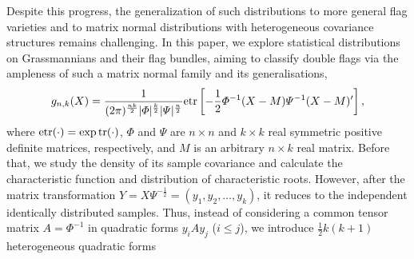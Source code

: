 \documentclass{amsart}
\theoremstyle{definition}
\numberwithin{equation}{section}
\begin{document}
Despite this progress, the generalization of such distributions to more general flag varieties and to matrix normal distributions with heterogeneous covariance structures remains challenging. In this paper, we explore statistical distributions on Grassmannians and their flag bundles, aiming to classify double flags via the ampleness of such a matrix normal family and its generalisations,
\begin{equation}
    \begin{aligned}
        g_{n,k}({X})  = \frac{1}{(2\pi)^{\frac{nk}{2}}| \varPhi|^{\frac{k}{2}}| \varPsi|^{\frac{n}{2}}} {\rm etr}\left[ - \frac{1}{2}\varPhi^{-1}({X} -  M) \varPsi^{-1}({X} -  M)^{\prime}\right],
    \end{aligned}
    \label{eq: dawid matrix normal distribution}
\end{equation}
where ${\rm etr}(\cdot) = \exp {\rm tr}(\cdot)$, $ \varPhi$ and $ \varPsi$ are $n\times n$ and $k \times k$ real symmetric positive definite matrices, respectively, and $ M$ is an arbitrary $n \times k$ real matrix. Before that, we study the density of its sample covariance and calculate the characteristic function and distribution of characteristic roots. However, after the matrix transformation $Y= X\varPsi^{-\frac{1}{2}}= (y_1,y_2,\dots,y_k)$, it reduces to the independent identically distributed samples. Thus, instead of considering a common tensor matrix $A = \varPhi^{-1}$ in quadratic forms $y_iAy_j$ ($i\leq j$), we introduce $\frac{1}{2}k(k+1)$ heterogeneous quadratic forms
\end{document}
